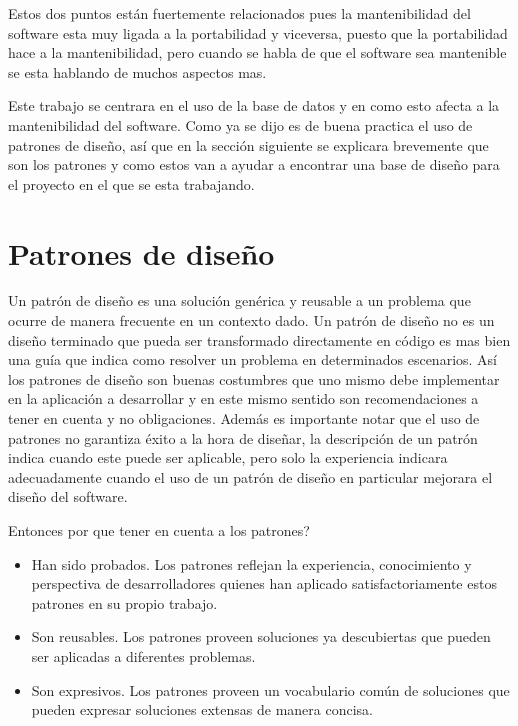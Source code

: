 %
Estos dos puntos están fuertemente relacionados pues la mantenibilidad del software esta muy ligada a la portabilidad y viceversa, puesto que la portabilidad hace a la mantenibilidad, pero cuando se habla de que el software sea mantenible se esta hablando de muchos aspectos mas.

Este trabajo se centrara en el uso de la base de datos y en como esto afecta a la mantenibilidad del software. Como ya se dijo es de buena practica el uso de patrones de diseño, así que en la sección siguiente  se explicara brevemente que son los patrones y como estos van a ayudar a encontrar una base de diseño para el proyecto en el que se esta trabajando. 
%
%
\section{Patrones de diseño}
%
Un patrón de diseño es una solución genérica y reusable  a un problema que ocurre de manera frecuente en un contexto dado. Un patrón de diseño no es un diseño terminado que pueda ser transformado directamente en código es mas bien una guía que indica como resolver un problema en determinados escenarios. Así los patrones de diseño son buenas costumbres que uno mismo debe implementar en la aplicación a desarrollar y en este mismo sentido son recomendaciones a tener en cuenta y no obligaciones\cite{Metsker:2002:DPJ}. Además es importante notar que el uso de patrones no garantiza éxito a la hora de diseñar, la descripción de un patrón indica cuando este puede ser aplicable, pero solo la experiencia indicara adecuadamente cuando el uso de un patrón de diseño en particular mejorara el diseño del software\cite{java:patrones}.

Entonces por que tener en cuenta a los patrones?
\begin{itemize}
\item Han sido probados. Los patrones reflejan la experiencia, conocimiento y perspectiva de desarrolladores quienes han aplicado satisfactoriamente estos patrones en su propio trabajo.
%
\item Son reusables. Los patrones proveen soluciones ya descubiertas que pueden ser aplicadas a diferentes problemas.
%
\item Son expresivos. Los patrones proveen un vocabulario común de soluciones que pueden expresar soluciones extensas de manera concisa.
\end{itemize}


